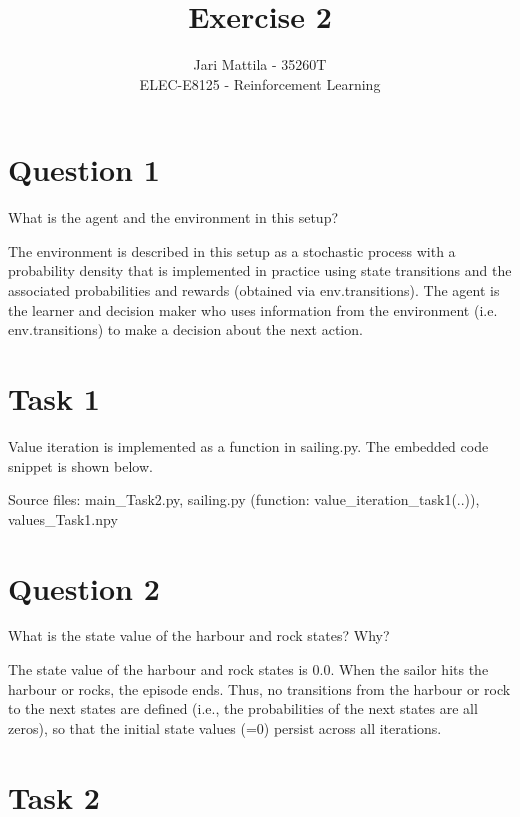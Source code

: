 \documentclass[12pt]{article}
\begin{document}
 
\title{Exercise 2}
\author{Jari Mattila - 35260T\\
ELEC-E8125 - Reinforcement Learning}

\maketitle
\section*{Question 1}
What is the agent and the environment in this setup?
\newline

The environment is described in this setup as a stochastic process with a probability density that is implemented in practice using state transitions and the associated probabilities and rewards (obtained via env.transitions). The agent is the learner and decision maker who uses information from the environment (i.e. env.transitions) to make a decision about the next action.

\section*{Task 1}

Value iteration is implemented as a function in sailing.py. The embedded code snippet is shown below.
\newline

\noindent
Source files: main\_Task2.py, sailing.py (function: value\_iteration\_task1(..)), values\_Task1.npy

\section*{Question 2}

What is the state value of the harbour and rock states? Why?
\newline

The state value of the harbour and rock states is 0.0. When the sailor hits the harbour or rocks, the episode ends. Thus, no transitions from the harbour or rock to the next states are defined (i.e., the probabilities of the next states are all zeros), so that the initial state values (=0) persist across all iterations.

\section*{Task 2}
\end{document}
